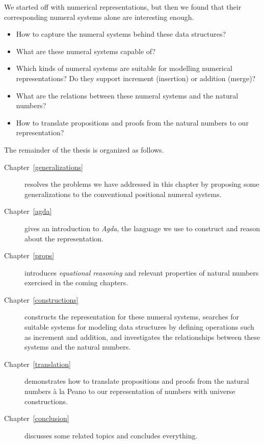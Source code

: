 \documentclass[\main/thesis.tex]{subfiles}
\begin{document}
We started off with numerical representations, but then we found that their
corresponding numeral systems alone are interesting enough.

\begin{itemize}
    \item How to capture the numeral systems behind these data structures?
    \item What are these numeral systems capable of?
    \item Which kinds of numeral systems are suitable for modelling numerical
        representations? Do they support increment (insertion) or addition (merge)?
    \item What are the relations between these numeral systems and the natural numbers?
    \item How to translate propositions and proofs from the natural numbers to
        our representation?
\end{itemize}

The remainder of the thesis is organized as follows.

\begin{description}
    \item[Chapter~\ref{generalizations}]
        resolves the problems we have addressed in this chapter by proposing
        some generalizations to the conventional positional numeral systems.
   \item[Chapter~\ref{agda}]
        gives an introduction to \textit{Agda}, the language we use to construct
        and reason about the representation.
   \item[Chapter~\ref{props}]
        introduces \textit{equational reasoning} and relevant properties
        of natural numbers exercised in the coming chapters.
   \item[Chapter~\ref{constructions}]
        constructs the representation for these numeral systems,
        searches for suitable systems for modeling data structures by
        defining operations such as increment and addition,
        and investigates the relationships between these systems and the natural numbers.
    \item[Chapter~\ref{translation}]
        demonstrates how to translate propositions and proofs from the natural
        numbers à la Peano to our representation of numbers with universe
        constructions.
    \item[Chapter~\ref{conclusion}] discusses some related topics and concludes
        everything.
\end{description}
\end{document}
